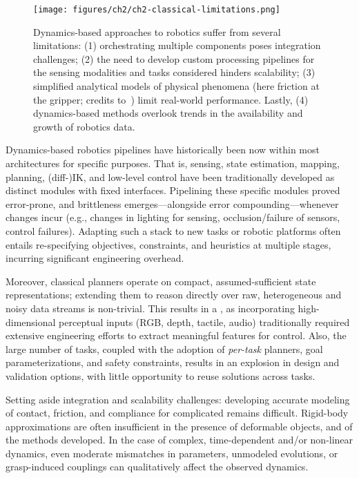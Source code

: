 \begin{figure}
    \centering
    \texttt{[image: figures/ch2/ch2-classical-limitations.png]}
    \caption{Dynamics-based approaches to robotics suffer from several limitations: (1) orchestrating multiple components poses integration challenges; (2) the need to develop custom processing pipelines for the sensing modalities and tasks considered hinders scalability; (3) simplified analytical models of physical phenomena (here friction at the gripper; credits to~\citet{antonovaReinforcementLearningPivoting2017}) limit real-world performance. Lastly, (4) dynamics-based methods overlook trends in the availability and growth of robotics data.}
    \label{fig:classical-limitations}
\end{figure}

Dynamics-based robotics pipelines have historically been  now within most architectures for specific purposes.
That is, sensing, state estimation, mapping, planning, (diff-)IK, and low-level control have been traditionally developed as distinct modules with fixed interfaces.
Pipelining these specific modules proved error-prone, and brittleness emerges---alongside error compounding---whenever changes incur (e.g., changes in lighting for sensing, occlusion/failure of sensors, control failures).
Adapting such a stack to new tasks or robotic platforms often entails re-specifying objectives, constraints, and heuristics at multiple stages, incurring significant engineering overhead.

Moreover, classical planners operate on compact, assumed-sufficient state representations; extending them to reason directly over raw, heterogeneous and noisy data streams is non-trivial.
This results in a , as incorporating high-dimensional perceptual inputs (RGB, depth, tactile, audio) traditionally required extensive engineering efforts to extract meaningful features for control. 
Also, the large number of tasks, coupled with the adoption of \emph{per-task} planners, goal parameterizations, and safety constraints, results in an explosion in design and validation options, with little opportunity to reuse solutions across tasks.

Setting aside integration and scalability challenges: developing accurate modeling of contact, friction, and compliance for complicated remains difficult.
Rigid-body approximations are often insufficient in the presence of deformable objects, and  of the methods developed.
In the case of complex, time-dependent and/or non-linear dynamics, even moderate mismatches in parameters, unmodeled evolutions, or grasp-induced couplings can qualitatively affect the observed dynamics.

